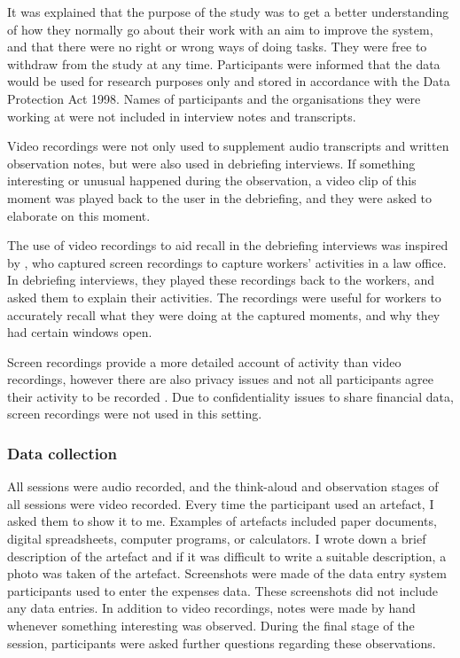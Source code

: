 It was explained that the purpose of the study was to get a better understanding of how they normally go about their work with an aim to improve the system, and that there were no right or wrong ways of doing tasks. They were free to withdraw from the study at any time.
Participants were informed that the data would be used for research purposes only and stored in accordance with the Data Protection Act 1998. Names of participants and the organisations they were working at were not included in interview notes and transcripts.

Video recordings were not only used to supplement audio transcripts and written observation notes, but were also used in debriefing interviews.
If something interesting or unusual happened during the observation, a video clip of this moment was played back to the user in the debriefing, and they were asked to elaborate on this moment.

The use of video recordings to aid recall in the debriefing interviews was inspired by \citet{Cangiano2009}, who captured screen recordings to capture workers' activities in a law office. In debriefing interviews, they played these recordings back to the workers, and asked them to explain their activities. The recordings were useful for workers to accurately recall what they were doing at the captured moments, and why they had certain windows open. 

Screen recordings provide a more detailed account of activity than video recordings, however there are also privacy issues and not all participants agree their activity to be recorded \citep{Rule2015}. Due to confidentiality issues to share financial data, screen recordings were not used in this setting.

\subsubsection{Data collection}
All sessions were audio recorded, and the think-aloud and observation stages of all sessions were video recorded. Every time the participant used an artefact, I asked them to show it to me. Examples of artefacts included paper documents, digital spreadsheets, computer programs, or calculators. I wrote down a brief description of the artefact and if it was difficult to write a suitable description, a photo was taken of the artefact. Screenshots were made of the data entry system participants used to enter the expenses data. These screenshots did not include any data entries. In addition to video recordings, notes were made by hand whenever something interesting was observed. During the final stage of the session, participants were asked further questions regarding these observations.

